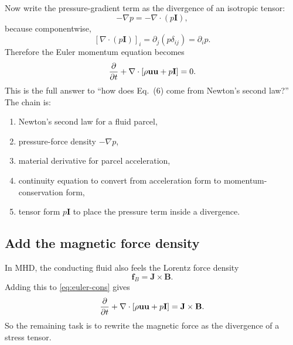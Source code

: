 \documentclass[11pt]{article}
\newcommand{\uvec}{\mathbf{u}}
\newcommand{\Bvec}{\mathbf{B}}
\newcommand{\Jvec}{\mathbf{J}}
\newcommand{\Iten}{\mathbf{I}}
\begin{document}
Now write the pressure-gradient term as the divergence of an isotropic tensor:
\begin{equation}
-\nabla p = -\nabla\cdot(p\Iten),
\label{eq:pressure-tensor-form}
\end{equation}
because componentwise,
\begin{equation}
\left[\nabla\cdot(p\Iten)\right]_i = \partial_j(p\delta_{ij}) = \partial_i p.
\label{eq:pressure-tensor-proof}
\end{equation}
Therefore the Euler momentum equation becomes
\begin{equation}
\pdv{}{t}(\rho\uvec) + \nabla\cdot\left[\rho\uvec\uvec + p\Iten\right] = 0.
\label{eq:euler-cons}
\end{equation}
This is the full answer to ``how does Eq.~(6) come from Newton's second law?'' The chain is:
\begin{enumerate}[leftmargin=1.8em]
    \item Newton's second law for a fluid parcel,
    \item pressure-force density $-\nabla p$,
    \item material derivative for parcel acceleration,
    \item continuity equation to convert from acceleration form to momentum-conservation form,
    \item tensor form $p\Iten$ to place the pressure term inside a divergence.
\end{enumerate}

\subsection{Add the magnetic force density}
In MHD, the conducting fluid also feels the Lorentz force density
\begin{equation}
\mathbf{f}_{B}=\Jvec\times\Bvec.
\label{eq:lorentz-density}
\end{equation}
Adding this to \eqref{eq:euler-cons} gives
\begin{equation}
\pdv{}{t}(\rho\uvec) + \nabla\cdot\left[\rho\uvec\uvec + p\Iten\right] = \Jvec\times\Bvec.
\label{eq:mhd-mom-with-lorentz}
\end{equation}
So the remaining task is to rewrite the magnetic force as the divergence of a stress tensor.
\end{document}
